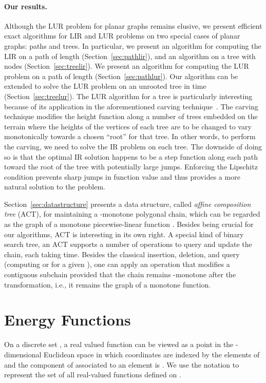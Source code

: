 \documentclass[11pt]{article}
\begin{document}
\paragraph{Our results.} 
Although the LUR problem for planar graphs remains elusive, we present
efficient exact algorithms for LIR and LUR problems on two special cases of 
planar graphs: paths and trees.  
In particular, we present an  algorithm for computing the LIR on a path of length  (Section~\ref{sec:pathlir}), and an  algorithm on a tree with  nodes (Section~\ref{sec:treelir}). 
We present an  algorithm for computing the
LUR problem on a path of length  (Section~\ref{sec:pathlur}). 
Our algorithm can be extended to solve the LUR problem on an unrooted tree in  time (Section~\ref{sec:treelur}). 
The LUR algorithm for a tree is particularly interesting because of 
its application in the aforementioned carving 
technique~\cite{Danner:07,Soille:04,Soille:03a}. 
The carving technique modifies the height function along a number 
of trees embedded on the terrain where the heights of the vertices 
of each tree are to be changed to vary monotonically towards 
a chosen ``root'' for that tree. In other words, to perform the 
carving, we need to solve the IR problem on each tree. The downside of 
doing so is that the optimal IR solution happens to be a step function 
along each path toward the root of the tree with potentially large 
jumps. Enforcing the Lipschitz condition prevents sharp jumps 
in function value and thus provides a more natural solution 
to the problem.

Section~\ref{sec:datastructure} presents a data structure, called {\em affine composition tree} (ACT), for maintaining a -monotone polygonal chain, which can be regarded as the graph of a monotone piecewise-linear function .  
Besides being crucial for our algorithms, ACT is interesting in its own right.
A special kind of binary search tree, an ACT supports a number of operations to query and update the chain, each taking  time.
Besides the classical insertion, deletion, and query (computing  or  for a given ),  one can apply an  operation that modifies a contiguous subchain provided that the chain  remains -monotone after the transformation, i.e., it remains the graph of a monotone function.  




\section{Energy Functions}
On a discrete set , a real valued function  can be viewed as a point in the -dimensional Euclidean space in which coordinates are indexed by the elements of  and the component  of  associated to an element  is . We use the notation  to represent the set of all real-valued functions defined on . 
\end{document}
